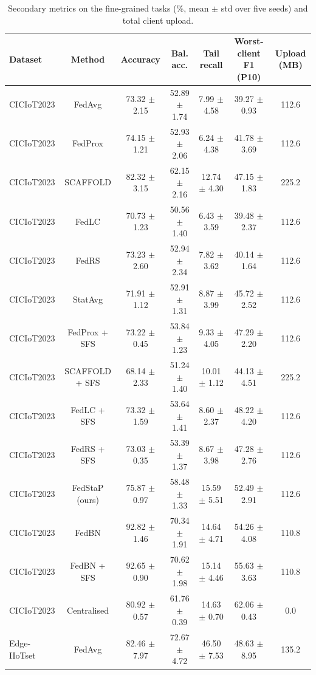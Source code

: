 \begin{table}[t]
\centering
\caption{Secondary metrics on the fine-grained tasks (\%, mean $\pm$ std over five seeds) and total client upload.}
\label{tab:secondary}
\small
\begin{tabular}{lcccccc}
\toprule
Dataset & Method & Accuracy & Bal. acc. & Tail recall & Worst-client F1 (P10) & Upload (MB) \\
\midrule
CICIoT2023 & FedAvg & 73.32 $\pm$ 2.15 & 52.89 $\pm$ 1.74 & 7.99 $\pm$ 4.58 & 39.27 $\pm$ 0.93 & 112.6 \\
CICIoT2023 & FedProx & 74.15 $\pm$ 1.21 & 52.93 $\pm$ 2.06 & 6.24 $\pm$ 4.38 & 41.78 $\pm$ 3.69 & 112.6 \\
CICIoT2023 & SCAFFOLD & 82.32 $\pm$ 3.15 & 62.15 $\pm$ 2.16 & 12.74 $\pm$ 4.30 & 47.15 $\pm$ 1.83 & 225.2 \\
CICIoT2023 & FedLC & 70.73 $\pm$ 1.23 & 50.56 $\pm$ 1.40 & 6.43 $\pm$ 3.59 & 39.48 $\pm$ 2.37 & 112.6 \\
CICIoT2023 & FedRS & 73.23 $\pm$ 2.60 & 52.94 $\pm$ 2.34 & 7.82 $\pm$ 3.62 & 40.14 $\pm$ 1.64 & 112.6 \\
CICIoT2023 & StatAvg & 71.91 $\pm$ 1.12 & 52.91 $\pm$ 1.31 & 8.87 $\pm$ 3.99 & 45.72 $\pm$ 2.52 & 112.6 \\
CICIoT2023 & FedProx + SFS & 73.22 $\pm$ 0.45 & 53.84 $\pm$ 1.23 & 9.33 $\pm$ 4.05 & 47.29 $\pm$ 2.20 & 112.6 \\
CICIoT2023 & SCAFFOLD + SFS & 68.14 $\pm$ 2.33 & 51.24 $\pm$ 1.40 & 10.01 $\pm$ 1.12 & 44.13 $\pm$ 4.51 & 225.2 \\
CICIoT2023 & FedLC + SFS & 73.32 $\pm$ 1.59 & 53.64 $\pm$ 1.41 & 8.60 $\pm$ 2.37 & 48.22 $\pm$ 4.20 & 112.6 \\
CICIoT2023 & FedRS + SFS & 73.03 $\pm$ 0.35 & 53.39 $\pm$ 1.37 & 8.67 $\pm$ 3.98 & 47.28 $\pm$ 2.76 & 112.6 \\
CICIoT2023 & FedStaP (ours) & 75.87 $\pm$ 0.97 & 58.48 $\pm$ 1.33 & 15.59 $\pm$ 5.51 & 52.49 $\pm$ 2.91 & 112.6 \\
CICIoT2023 & FedBN & 92.82 $\pm$ 1.46 & 70.34 $\pm$ 1.91 & 14.64 $\pm$ 4.71 & 54.26 $\pm$ 4.08 & 110.8 \\
CICIoT2023 & FedBN + SFS & 92.65 $\pm$ 0.90 & 70.62 $\pm$ 1.98 & 15.14 $\pm$ 4.46 & 55.63 $\pm$ 3.63 & 110.8 \\
CICIoT2023 & Centralised & 80.92 $\pm$ 0.57 & 61.76 $\pm$ 0.39 & 14.63 $\pm$ 0.70 & 62.06 $\pm$ 0.43 & 0.0 \\
Edge-IIoTset & FedAvg & 82.46 $\pm$ 7.97 & 72.67 $\pm$ 4.72 & 46.50 $\pm$ 7.53 & 48.63 $\pm$ 8.95 & 135.2 \\

\end{tabular}
\end{table}
